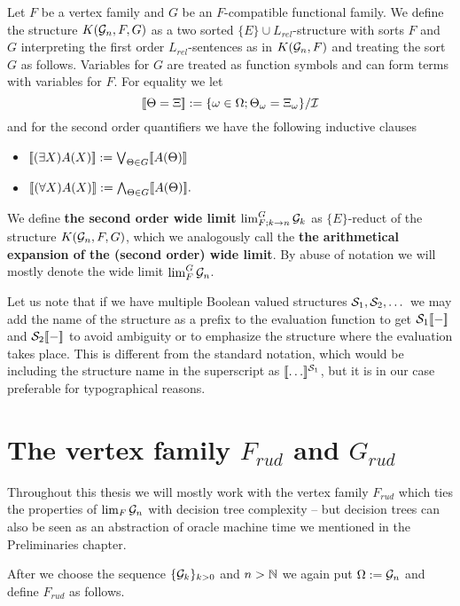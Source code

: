 \begin{defi}
Let $F$ be a vertex family and $G$ be an $F$-compatible functional family. We define the structure $K(\G_n,F,G)$ as a two sorted $\{E\}\cup L_{rel}$-structure with sorts $F$ and $G$ interpreting the first order $L_{rel}$-sentences as in $K(\G_n,F)$ and treating the sort $G$ as follows. Variables for $G$ are treated as function symbols and can form terms with variables for $F$. For equality we let
\[\bbl\Theta=\Xi \bbr := \{\omega\in \Omega;\Theta_\omega=\Xi_\omega\}/\I\]
and for the second order quantifiers we have the following inductive clauses
\begin{itemize}
\item $\bbl(\exists X)A(X)\bbr:=\Lor_{\Theta\in G}\bbl A(\Theta)\bbr$
\item $\bbl(\forall X)A(X)\bbr:=\Land_{\Theta\in G}\bbl A(\Theta)\bbr.$
\end{itemize}

We define \textbf{the second order wide limit} $\lim_{F; k\to n}^G \G_k$ as $\{E\}$-reduct of the structure $K(\G_n,F,G)$, which we analogously call the \textbf{the arithmetical expansion of the (second order) wide limit}. By abuse of notation we will mostly denote the wide limit $\lim_F^G\G_n$.
\end{defi}

Let us note that if we have multiple Boolean valued structures $\S_1,\S_2,\dots$ we may add the name of the structure as a prefix to the evaluation function to get $\S_1\bbl-\bbr$ and $\S_2\bbl-\bbr$ to avoid ambiguity or to emphasize the structure where the evaluation takes place. This is different from the standard notation, which would be including the structure name in the superscript as $\bbl\dots\bbr^{\S_1}$, but it is in our case preferable for typographical reasons.
 
\section{The vertex family $F_{rud}$ and $G_{rud}$}\label{secFrud}

Throughout this thesis we will mostly work with the vertex family $F_{rud}$ which ties the properties of $\lim_F \G_n$ with decision tree complexity -- but decision trees can also be seen as an abstraction of oracle machine time we mentioned in the Preliminaries chapter.

After we choose the sequence $\{\G_k\}_{k>0}$ and $n>\N$ we again put $\Omega:=\G_n$ and define $F_{rud}$ as follows.

